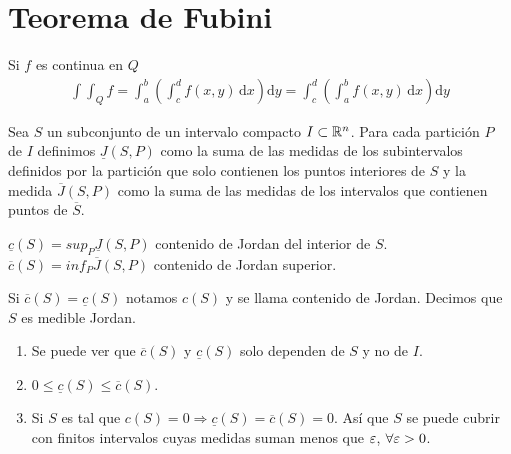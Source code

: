 \section{Teorema de Fubini}
\begin{corollary}[Fubini]
  Si \(f\) es continua en \(Q\) \begin{align*}
    \int\int_Q f = \int_a^b(\int_c^d f(x, y) \, \mathrm{d}x) \mathrm{d}y = \int_c^d(\int_a^b f(x, y)\, \mathrm{d}x)\mathrm{d}y
  \end{align*}
\end{corollary}

\begin{definition}
  Sea \(S\) un subconjunto de un intervalo compacto \(I \subset \mathbb{R}^n\). Para cada partición \(P\) de \(I\) definimos \(\underline{J}(S, P)\) como la suma de las medidas de los subintervalos definidos por la partición que solo contienen los puntos interiores de \(S\) y la medida \(\overline{J}(S, P)\) como la suma de las medidas de los intervalos que contienen puntos de \(\overline{S}\).
\end{definition}

\begin{definition}
  \(\underline{c}(S) = sup_P \underline{J}(S, P)\) contenido de Jordan del interior de \(S\).
  \(\overline{c}(S) = inf_P \overline{J}(S, P)\) contenido de Jordan superior.
\end{definition}

\clearpage

\begin{definition}
  Si \(\overline{c}(S) = \underline{c}(S)\) notamos \(c(S)\) y se llama contenido de Jordan. Decimos que \(S\) es medible Jordan.
\end{definition}

\begin{note}
  \begin{enumerate}
    \item Se puede ver que \(\overline{c}(S)\) y \(\underline{c}(S)\) solo dependen de \(S\) y no de \(I\).
    \item \(0 \leq \underline{c}(S) \leq \overline{c}(S)\).
    \item Si \(S\) es tal que \(c(S) = 0 \Rightarrow \underline{c}(S) = \overline{c}(S) = 0\). Así que \(S\) se puede cubrir con finitos intervalos cuyas medidas suman menos que \(\varepsilon\), \(\forall \varepsilon > 0\).
  \end{enumerate}
\end{note}
